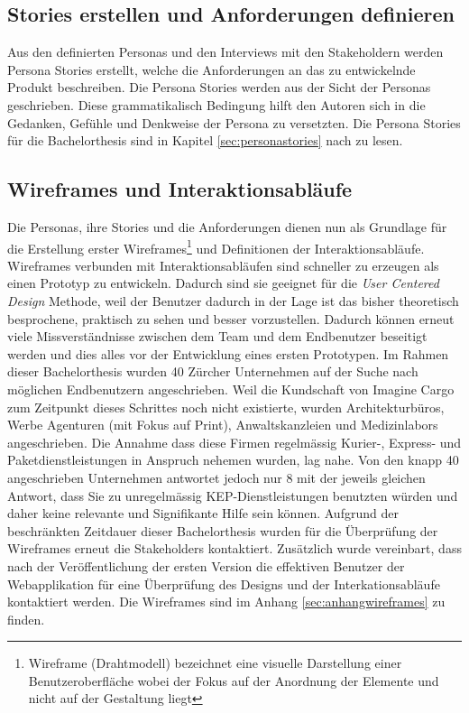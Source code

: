 \subsection{Stories erstellen und Anforderungen definieren}
Aus den definierten Personas und den Interviews mit den Stakeholdern werden Persona Stories erstellt, welche die Anforderungen an das zu entwickelnde Produkt beschreiben. Die Persona Stories werden aus der Sicht der Personas geschrieben. Diese grammatikalisch Bedingung hilft den Autoren sich in die Gedanken, Gefühle und Denkweise der Persona zu versetzten. Die Persona Stories für die Bachelorthesis sind in Kapitel \ref{sec:personastories} nach zu lesen.

\subsection{Wireframes und Interaktionsabläufe}
Die Personas, ihre Stories und die Anforderungen dienen nun als Grundlage für die Erstellung erster Wireframes\footnote{ Wireframe (Drahtmodell) bezeichnet eine visuelle Darstellung einer Benutzeroberfläche wobei der Fokus auf der Anordnung der Elemente und nicht auf der Gestaltung liegt} und Definitionen der Interaktionsabläufe. Wireframes verbunden mit Interaktionsabläufen sind schneller zu erzeugen als einen Prototyp zu entwickeln. Dadurch sind sie geeignet für die \textit{User Centered Design} Methode, weil der Benutzer dadurch in der Lage ist das bisher theoretisch besprochene, praktisch zu sehen und besser vorzustellen. Dadurch können erneut viele Missverständnisse zwischen dem Team und dem Endbenutzer beseitigt werden und dies alles vor der Entwicklung eines ersten Prototypen. Im Rahmen dieser Bachelorthesis wurden 40 Zürcher Unternehmen auf der Suche nach möglichen Endbenutzern angeschrieben. Weil die Kundschaft von Imagine Cargo zum Zeitpunkt dieses Schrittes noch nicht existierte, wurden Architekturbüros, Werbe Agenturen (mit Fokus auf Print), Anwaltskanzleien und Medizinlabors angeschrieben. Die Annahme dass diese Firmen regelmässig Kurier-, Express- und Paketdienstleistungen in Anspruch nehemen wurden, lag nahe. Von den knapp 40 angeschrieben Unternehmen antwortet jedoch nur 8 mit der jeweils gleichen Antwort, dass Sie zu unregelmässig KEP-Dienstleistungen benutzten würden und daher keine relevante und Signifikante Hilfe sein können. Aufgrund der beschränkten Zeitdauer dieser Bachelorthesis wurden für die Überprüfung der Wireframes erneut die Stakeholders kontaktiert. Zusätzlich wurde vereinbart, dass nach der Veröffentlichung der ersten Version die effektiven Benutzer der Webapplikation für eine Überprüfung des Designs und der Interkationsabläufe kontaktiert werden. Die Wireframes sind im Anhang \ref{sec:anhangwireframes} zu finden.

